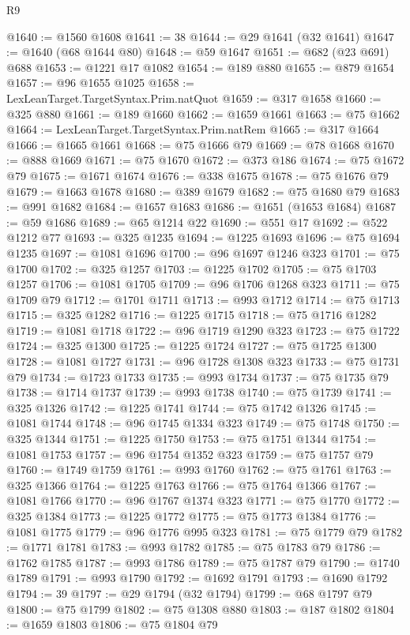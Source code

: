 \begin{lexlean}{R9}
\begin{coremodule}
@1640 := @1560 @1608
@1641 := 38
@1644 := @29 @1641 (@32 @1641)
@1647 := @1640 (@68 @1644 @80)
@1648 := @59 @1647
@1651 := @682 (@23 @691) @688
@1653 := @1221 @17 @1082
@1654 := @189 @880
@1655 := @879 @1654
@1657 := @96 @1655 @1025
@1658 := LexLeanTarget.TargetSyntax.Prim.natQuot
@1659 := @317 @1658
@1660 := @325 @880
@1661 := @189 @1660
@1662 := @1659 @1661
@1663 := @75 @1662
@1664 := LexLeanTarget.TargetSyntax.Prim.natRem
@1665 := @317 @1664
@1666 := @1665 @1661
@1668 := @75 @1666 @79
@1669 := @78 @1668
@1670 := @888 @1669
@1671 := @75 @1670
@1672 := @373 @186
@1674 := @75 @1672 @79
@1675 := @1671 @1674
@1676 := @338 @1675
@1678 := @75 @1676 @79
@1679 := @1663 @1678
@1680 := @389 @1679
@1682 := @75 @1680 @79
@1683 := @991 @1682
@1684 := @1657 @1683
@1686 := @1651 (@1653 @1684)
@1687 := @59 @1686
@1689 := @65 @1214 @22
@1690 := @551 @17
@1692 := @522 @1212 @77
@1693 := @325 @1235
@1694 := @1225 @1693
@1696 := @75 @1694 @1235
@1697 := @1081 @1696
@1700 := @96 @1697 @1246 @323
@1701 := @75 @1700
@1702 := @325 @1257
@1703 := @1225 @1702
@1705 := @75 @1703 @1257
@1706 := @1081 @1705
@1709 := @96 @1706 @1268 @323
@1711 := @75 @1709 @79
@1712 := @1701 @1711
@1713 := @993 @1712
@1714 := @75 @1713
@1715 := @325 @1282
@1716 := @1225 @1715
@1718 := @75 @1716 @1282
@1719 := @1081 @1718
@1722 := @96 @1719 @1290 @323
@1723 := @75 @1722
@1724 := @325 @1300
@1725 := @1225 @1724
@1727 := @75 @1725 @1300
@1728 := @1081 @1727
@1731 := @96 @1728 @1308 @323
@1733 := @75 @1731 @79
@1734 := @1723 @1733
@1735 := @993 @1734
@1737 := @75 @1735 @79
@1738 := @1714 @1737
@1739 := @993 @1738
@1740 := @75 @1739
@1741 := @325 @1326
@1742 := @1225 @1741
@1744 := @75 @1742 @1326
@1745 := @1081 @1744
@1748 := @96 @1745 @1334 @323
@1749 := @75 @1748
@1750 := @325 @1344
@1751 := @1225 @1750
@1753 := @75 @1751 @1344
@1754 := @1081 @1753
@1757 := @96 @1754 @1352 @323
@1759 := @75 @1757 @79
@1760 := @1749 @1759
@1761 := @993 @1760
@1762 := @75 @1761
@1763 := @325 @1366
@1764 := @1225 @1763
@1766 := @75 @1764 @1366
@1767 := @1081 @1766
@1770 := @96 @1767 @1374 @323
@1771 := @75 @1770
@1772 := @325 @1384
@1773 := @1225 @1772
@1775 := @75 @1773 @1384
@1776 := @1081 @1775
@1779 := @96 @1776 @995 @323
@1781 := @75 @1779 @79
@1782 := @1771 @1781
@1783 := @993 @1782
@1785 := @75 @1783 @79
@1786 := @1762 @1785
@1787 := @993 @1786
@1789 := @75 @1787 @79
@1790 := @1740 @1789
@1791 := @993 @1790
@1792 := @1692 @1791
@1793 := @1690 @1792
@1794 := 39
@1797 := @29 @1794 (@32 @1794)
@1799 := @68 @1797 @79
@1800 := @75 @1799
@1802 := @75 @1308 @880
@1803 := @187 @1802
@1804 := @1659 @1803
@1806 := @75 @1804 @79

\end{coremodule}
\end{lexlean}
